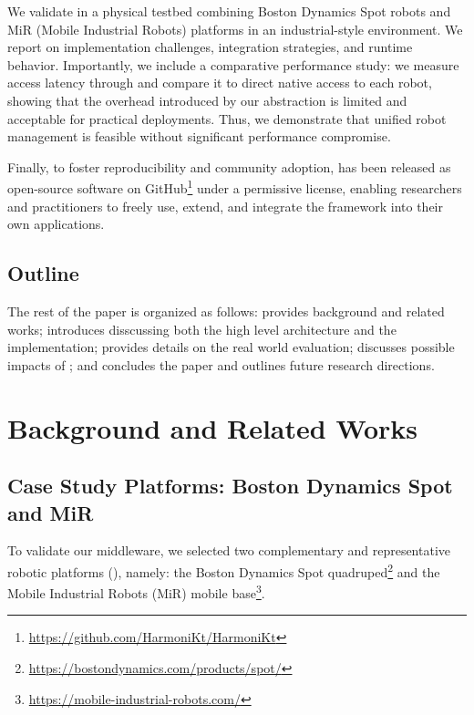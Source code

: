 \documentclass[conference]{IEEEtran}
\begin{document}
We validate \approach{} in a physical testbed combining Boston Dynamics Spot robots 
 and MiR (Mobile Industrial Robots) platforms in an industrial-style environment. 
% 
We report on implementation challenges, integration strategies, and runtime behavior. 
%
Importantly, we include a comparative performance study: 
 we measure access latency through \approach{} and compare it to direct native access to each robot, 
 showing that the overhead introduced by our abstraction is limited and acceptable for practical deployments. 
% 
Thus, we demonstrate that unified robot management is feasible without significant performance compromise.


Finally, 
 to foster reproducibility and community adoption, 
  \approach{} has been released as open-source software 
  on GitHub\footnote{\url{https://github.com/HarmoniKt/HarmoniKt}} 
  under a permissive license, enabling researchers and practitioners to freely use, extend, 
  and integrate the framework into their own applications.

\subsection{Outline}
The rest of the paper is organized as follows:
  provides background and related works;
  introduces \approach{} disscussing both the high level architecture and the implementation;
  provides details on the real world evaluation;
  discusses possible impacts of \approach{};
 and  concludes the paper and outlines future research directions.

\section{Background and Related Works}\label{sec:related}

\subsection{Case Study Platforms: Boston Dynamics Spot and MiR}

To validate our middleware, 
 we selected two complementary and representative robotic platforms (), namely: 
 the Boston Dynamics Spot quadruped\footnote{\url{https://bostondynamics.com/products/spot/}}
 and the Mobile Industrial Robots (MiR) mobile base\footnote{\url{https://mobile-industrial-robots.com/}}.
\end{document}
